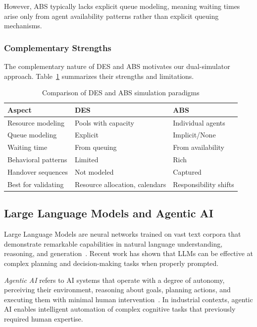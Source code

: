 \documentclass[preprint,12pt]{elsarticle}
\begin{document}
However, ABS typically lacks explicit queue modeling, meaning waiting times arise only from agent availability patterns rather than explicit queuing mechanisms.

\subsubsection{Complementary Strengths}

The complementary nature of DES and ABS motivates our dual-simulator approach. Table~\ref{tab:simulators} summarizes their strengths and limitations.

\begin{table}[htbp]
\centering
\caption{Comparison of DES and ABS simulation paradigms}
\label{tab:simulators}
\begin{tabular}{@{}lll@{}}
\toprule
\textbf{Aspect} & \textbf{DES} & \textbf{ABS} \\
\midrule
Resource modeling & Pools with capacity & Individual agents \\
Queue modeling & Explicit & Implicit/None \\
Waiting time & From queuing & From availability \\
Behavioral patterns & Limited & Rich \\
Handover sequences & Not modeled & Captured \\
Best for validating & Resource allocation, calendars & Responsibility shifts \\
\bottomrule
\end{tabular}
\end{table}

\subsection{Large Language Models and Agentic AI}

Large Language Models are neural networks trained on vast text corpora that demonstrate remarkable capabilities in natural language understanding, reasoning, and generation~\cite{brown2020language}. Recent work has shown that LLMs can be effective at complex planning and decision-making tasks when properly prompted.

\textit{Agentic AI} refers to AI systems that operate with a degree of autonomy, perceiving their environment, reasoning about goals, planning actions, and executing them with minimal human intervention~\cite{wang2024survey}. In industrial contexts, agentic AI enables intelligent automation of complex cognitive tasks that previously required human expertise.
\end{document}
